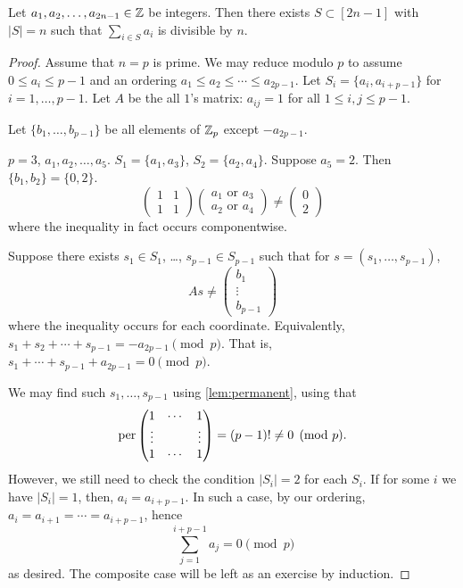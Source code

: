 \begin{theorem}
Let $a_1,a_2,\dotsc,a_{2n-1}\in \mathbb{Z}$ be integers. Then there exists $S\subset [2n-1]$ with $|S| = n$ such that $\sum_{i\in S} a_i$ is divisible by $n$.
\end{theorem}
\begin{proof}	
Assume that $n=p$ is prime. We may reduce modulo $p$ to assume $0\leq a_i \leq p-1$ and an ordering $a_1\leq a_2 \leq \dotsm \leq a_{2p-1}$. Let $S_i = \{a_i,a_{i+p-1}\}$ for $i=1,\dotsc,p-1$. Let $A$ be the all $1$'s matrix: $a_{ij} = 1$ for all $1\leq i,j\leq p-1$.

Let $\{b_1,\dotsc,b_{p-1}\}$ be all elements of $\mathbb{Z}_p$ except $-a_{2p-1}$.

\begin{example}
$p=3$, $a_1,a_2,\dotsc,a_5$. $S_1 = \{a_1,a_3\}$, $S_2 = \{a_2,a_4\}$. Suppose $a_5=2$. Then $\{b_1,b_2\} = \{0,2\}$.
\[
\begin{pmatrix}
1 & 1\\
1 & 1
\end{pmatrix} \begin{pmatrix}
a_1 \text{ or } a_3 \\ a_2 \text{ or } a_4
\end{pmatrix} \neq \begin{pmatrix}
0 \\ 2
\end{pmatrix}
\]
where the inequality in fact occurs componentwise.
\end{example}


Suppose there exists $s_1\in S_1$, \ldots, $s_{p-1} \in S_{p-1}$ such that for $s = (s_1,\dotsc,s_{p-1})$, 
\[
As \neq \begin{pmatrix}
b_1 \\ \vdots \\ b_{p-1}
\end{pmatrix}
\]
where the inequality occurs for each coordinate. Equivalently, $s_1 + s_2 + \dotsm + s_{p-1} = - a_{2p-1} \pmod{p}$. That is, $s_1 + \dotsm +  s_{p-1} + a_{2p-1} =  0 \pmod{p}$.

We may find such $s_1,\dotsc,s_{p-1}$ using \cref{lem:permanent}, using that
\[
\operatorname{per} \begin{pmatrix}
1 & \dotsm & 1\\
\vdots & & \vdots \\
1 & \dotsm & 1
\end{pmatrix} = (p-1)! \neq 0 \pmod{p}.
\]
However, we still need to check the condition $|S_i| = 2$ for each $S_i$. If for some $i$ we have $|S_i|=1$, then, $a_i = a_{i+p-1}$. In such a case, by our ordering, $a_i = a_{i+1} = \dotsm = a_{i+p-1}$,  hence
\[
\sum_{j=1}^{i + p-1} a_j = 0 \pmod{p}
\]
as desired.
The composite case will be left as an exercise by induction.
\end{proof}


